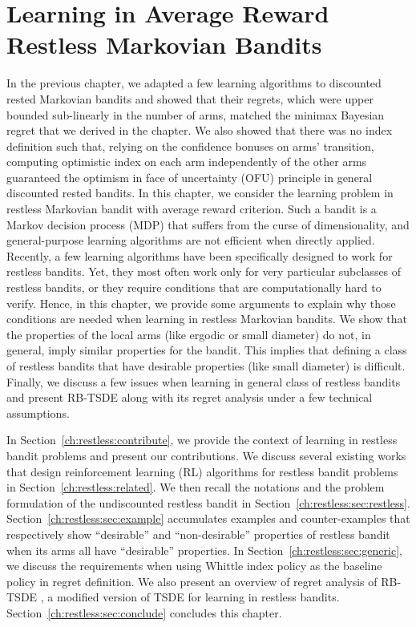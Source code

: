 \begingroup
\let\clearpage\relax

\chapter{Learning in Average Reward Restless Markovian Bandits}
\label{ch:learning_restless}


In the previous chapter, we adapted a few learning algorithms to discounted rested Markovian bandits and showed that their regrets, which were upper bounded sub-linearly in the number of arms, matched the minimax Bayesian regret that we derived in the chapter.
We also showed that there was no index definition such that, relying on the confidence bonuses on arms' transition, computing optimistic index on each arm independently of the other arms guaranteed the optimism in face of uncertainty (OFU) principle in general discounted rested bandits.
In this chapter, we consider the learning problem in restless Markovian bandit with average reward criterion.
Such a bandit is a Markov decision process (MDP) that suffers from the curse of dimensionality, and general-purpose learning algorithms are not efficient when directly applied. Recently, a few learning algorithms have been specifically designed to work for restless bandits. Yet, they most often work only for very particular subclasses of restless bandits, or they require conditions that are computationally hard to verify.
Hence, in this chapter, we provide some arguments to explain why those conditions are needed when learning in restless Markovian bandits. We show that the properties of the local arms (like ergodic or small diameter) do not, in general, imply similar properties for the bandit. This implies that defining a class of restless bandits that have desirable properties (like small diameter) is difficult. 
Finally, we discuss a few issues when learning in general class of restless bandits and present RB-TSDE \cite{akbarzadeh2022learning} along with its regret analysis under a few technical assumptions.

In Section~\ref{ch:restless:contribute}, we provide the context of learning in restless bandit problems and present our contributions.
We discuss several existing works that design reinforcement learning (RL) algorithms for restless bandit problems in Section~\ref{ch:restless:related}.
We then recall the notations and the problem formulation of the undiscounted restless bandit in Section~\ref{ch:restless:sec:restless}.
Section~\ref{ch:restless:sec:example} accumulates examples and counter-examples that respectively show ``desirable'' and ``non-desirable'' properties of restless bandit when its arms all have ``desirable'' properties.
In Section~\ref{ch:restless:sec:generic}, we discuss the requirements when using Whittle index policy as the baseline policy in regret definition.
We also present an overview of regret analysis of RB-TSDE \cite{akbarzadeh2022learning}, a modified version of TSDE \cite{ouyang2017learning} for learning in restless bandits.
Section~\ref{ch:restless:sec:conclude} concludes this chapter.

